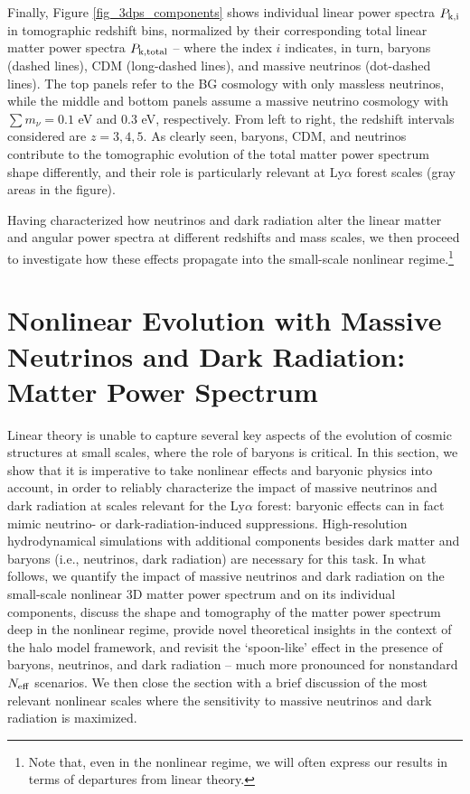 \documentclass{emulateapj}
\begin{document}
Finally,  Figure \ref{fig_3dps_components}  shows individual linear power spectra $P_{\rm k, i}$ in tomographic redshift bins, normalized by  their corresponding
 total linear matter power spectra $P_{\rm k, total}$ --
where the index $i$ indicates, in turn, baryons (dashed lines), CDM (long-dashed lines), and massive neutrinos (dot-dashed lines).
The top panels refer to the  BG cosmology with only massless neutrinos, while  the middle and bottom panels
assume a massive neutrino cosmology with $\sum m_{\nu}=0.1$ eV and $0.3$ eV, respectively. 
From left to right, the redshift intervals considered are $z=3,4,5$. 
As clearly seen, baryons, CDM, and neutrinos contribute to the tomographic evolution of 
the total matter power spectrum shape 
differently, and their role is particularly relevant at Ly$\alpha$ forest scales (gray areas in the figure).
 
Having characterized 
how neutrinos and dark radiation alter the linear matter and angular power spectra at different redshifts and mass scales, we then proceed to
investigate how these effects propagate into the small-scale nonlinear regime.\footnote{Note that, even in the nonlinear regime, we will often express our results in terms of departures from linear theory.}
 


\section{Nonlinear Evolution with Massive Neutrinos and Dark Radiation: Matter Power Spectrum} \label{section_nl_3d_ps}

Linear theory is unable to capture several key aspects of the  evolution of cosmic structures at small scales, where the role of baryons is
critical. In this section, we show that it is imperative to take nonlinear effects and baryonic physics into account, in order to reliably   
characterize the impact of massive neutrinos and dark radiation at scales relevant for the Ly$\alpha$ forest: baryonic effects can in fact mimic neutrino- or dark-radiation-induced suppressions.  
High-resolution hydrodynamical  simulations with additional components  besides dark matter and baryons (i.e., neutrinos, dark radiation) are necessary
for this task. In what follows, we quantify the impact of massive neutrinos and dark radiation on the small-scale nonlinear 3D matter power spectrum
and on its individual components, discuss the shape and tomography of the matter power spectrum deep in the nonlinear regime, provide novel theoretical insights in the context of the halo model framework,
and revisit the `spoon-like' effect  in the presence of baryons, neutrinos, and dark radiation -- much more pronounced for nonstandard $N_{\rm eff}$ scenarios.
We then close the section with a brief
discussion of the most relevant nonlinear scales where the 
sensitivity to massive neutrinos and dark radiation is maximized.
\end{document}
